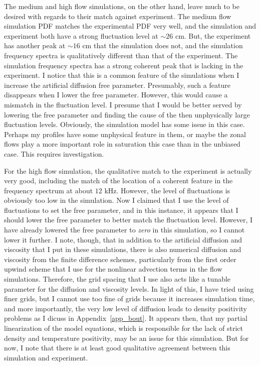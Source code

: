 The medium and high flow simulations, on the other hand, leave much to be desired with regards to their match against experiment. The medium flow simulation PDF matches the experimental PDF very well,
and the simulation and experiment both have a strong fluctuation level at $\sim 26$ cm. But, the experiment has another peak at $\sim 16$ cm that the simulation does not, and the simulation
frequency spectra is qualitatively different than that of the experiment. The simulation frequency spectra has a strong coherent peak that is lacking in the experiment. I notice that this is
a common feature of the simulations when I increase the artificial diffusion free parameter. Presumably, such a feature disappears when I lower the free parameter. However, this would cause
a mismatch in the fluctuation level. I presume that I would be better served by lowering the free parameter and finding the cause of the then unphysically large fluctuation levels.
Obviously, the simulation model has some issue in this case. Perhaps my profiles have some unphysical feature in them, or maybe the zonal flows play a more
important role in saturation this case than in the unbiased case. This requires investigation.

For the high flow simulation, the qualitative match to the experiment is actually very good, including the match of the location of a coherent feature in the frequency spectrum at about $12$ kHz. 
However, the level of fluctuations is obviously too low in the simulation. Now I claimed that I use
the level of fluctuations to set the free parameter, and in this instance, it appears that I should lower the free parameter to better match the fluctuation level. However, I have already
lowered the free parameter to \emph{zero} in this simulation, so I cannot lower it further. I note, though, that in addition to the artificial diffusion and viscosity that I put in these simulations,
there is also numerical diffusion and viscosity from the finite difference schemes, particularly from the first order upwind scheme that I use for the nonlinear advection terms in the flow
simulations. Therefore, the grid spacing that I use also acts like a tunable parameter for the diffusion and viscosity levels. In light of this, I have tried using finer grids, but I cannot
use too fine of grids because it increases simulation time, and more importantly, the very low level of diffusion leads to density positivity problems as I dicuss in Appendix~\ref{app_bout}.
It appears then, that my partial linearization of the model equations, which is responsible for the lack of strict density and temperature positivity, may be an issue for this simulation.
But for now, I note that there is at least good qualitative agreement between this simulation and experiment.


